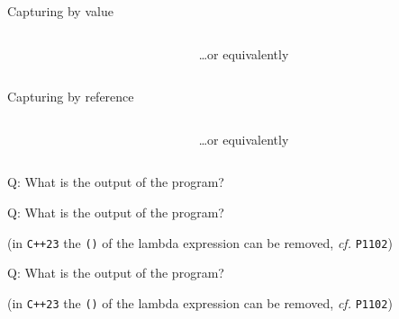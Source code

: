 \begin{frame}[fragile]{Capturing by value}
    \begin{columns}[t]
        \begin{column}{.45\textwidth}
        \end{column}
        \begin{column}{.45\textwidth}
            \ldots or equivalently
        \end{column}
    \end{columns}
\end{frame}

\begin{frame}[fragile]{Capturing by reference}
    \begin{columns}[t]
        \begin{column}{.45\textwidth}
        \end{column}
        \begin{column}{.45\textwidth}
            \ldots or equivalently
        \end{column}
    \end{columns}
\end{frame}

\begin{frame}[fragile]{Q: What is the output of the program?}

\end{frame}

\begin{frame}[fragile]{Q: What is the output of the program?}

    \vspace{5mm}

    \begin{center}
        ({\footnotesize in \texttt{C++23} the \texttt{()} of the lambda expression can be removed, \textit{cf.} \texttt{P1102}})
    \end{center}
\end{frame}


\begin{frame}[fragile]{Q: What is the output of the program?}

    \vspace{5mm}

    \begin{center}
        ({\footnotesize in \texttt{C++23} the \texttt{()} of the lambda expression can be removed, \textit{cf.} \texttt{P1102}})
    \end{center}
\end{frame}



